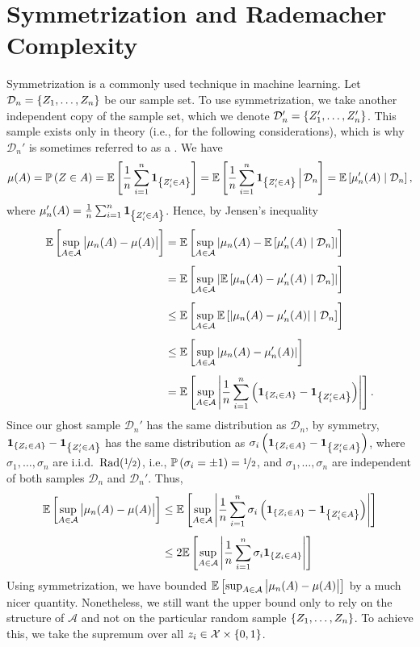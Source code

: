 \section{Symmetrization and Rademacher Complexity}
\label{sec: symmetrization}

Symmetrization is a commonly used technique in machine learning. Let $\mathcal{D}_n = \set{Z_1, \dots, Z_n}$ be our sample set. To use symmetrization, we take another independent copy of the sample set, which we denote $\mathcal{D}_n' = \set{Z_1', \dots, Z_n'}$. This sample exists only in theory (i.e., for the following considerations), which is why $\mathcal{D}_n'$ is sometimes referred to as a . We have
\[
    \mu(A) = \Pr{Z \in A} = \Ex{\frac{1}{n} \sum_{i=1}^n \indSet{Z_i' \in A}} = \Ex{\frac{1}{n} \sum_{i=1}^n \indSet{Z_i' \in A} \,\Big\vert\, \mathcal{D}_n} = \Ex{\mu_n'(A) \given \mathcal{D}_n},
\]
where $\mu_n'(A) = \frac{1}{n} \sum_{i=1}^n \indSet{Z_i' \in A}$. Hence, by Jensen's inequality
\begin{align*}
    \Ex{\sup_{A \in \mathcal{A}} \bigAbs{ \mu_n(A) - \mu(A) }} &= \Ex{\sup_{A \in \mathcal{A}} \abs{ \mu_n(A) - \Ex{\mu_n'(A) \given \mathcal{D}_n} }} \\[4pt]
        &= \Ex{\sup_{A \in \mathcal{A}} \abs{ \Ex{\mu_n(A) - \mu_n'(A) \given \mathcal{D}_n} }} \\[4pt]
        &\leq \Ex{\sup_{A \in \mathcal{A}} \Ex{\abs{ \mu_n(A) - \mu_n'(A) } \given \mathcal{D}_n} } \\[4pt]
        &\leq \Ex{\sup_{A \in \mathcal{A}} \abs{ \mu_n(A) - \mu_n'(A) }} \\[4pt]
        &= \Ex{\sup_{A \in \mathcal{A}} \abs{ \frac{1}{n} \sum_{i=1}^n \left(\indSet{Z_i \in A} - \indSet{Z_i' \in A}\right) }}.
\end{align*}
Since our ghost sample $\mathcal{D}_n'$ has the same distribution as $\mathcal{D}_n$, by symmetry, $\indSet{Z_i \in A} - \indSet{Z_i' \in A}$ has the same distribution as $\sigma_i \left(\indSet{Z_i \in A} - \indSet{Z_i' \in A}\right)$, where $\sigma_1, \dots, \sigma_n$ are i.i.d.\ $\mathrm{Rad}(\nicefrac{1}{2})$, i.e., $\Pr{\sigma_i = \pm 1} = \nicefrac{1}{2}$, and $\sigma_1, \dots, \sigma_n$ are independent of both samples $\mathcal{D}_n$ and $\mathcal{D}_n'$. Thus,
\begin{align}
    \Ex{\sup_{A \in \mathcal{A}} \bigAbs{ \mu_n(A) - \mu(A) }} &\leq \Ex{\sup_{A \in \mathcal{A}} \abs{ \frac{1}{n} \sum_{i=1}^n \sigma_i \left(\indSet{Z_i \in A} - \indSet{Z_i' \in A}\right) }} \nonumber \\[4pt]
        \label{eq: precursor to symmetrization bound}
        &\leq 2 \Ex{\sup_{A \in \mathcal{A}} \abs{ \frac{1}{n} \sum_{i=1}^n \sigma_i \indSet{Z_i \in A}}}
\end{align}
Using symmetrization, we have bounded $\Ex{\sup_{A \in \mathcal{A}} \bigAbs{ \mu_n(A) - \mu(A) }}$ by a much nicer quantity. Nonetheless, we still want the upper bound only to rely on the structure of $\mathcal{A}$ and not on the particular random sample $\set{Z_1, \dots, Z_n}$. To achieve this, we take the supremum over all $z_i \in \mathcal{X} \times \set{0, 1}$.

